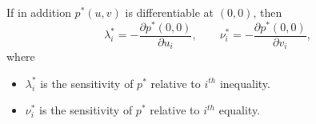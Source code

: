 \newpar{}

If in addition $p^*(u,v)$ is differentiable at $(0,0)$, then
\begin{equation*}
    \lambda_i^* = -\frac{\partial p^*(0,0)}{\partial u_i}, \qquad  \nu_i^* = -\frac{\partial p^*(0,0)}{\partial v_i},
\end{equation*}
where
\begin{itemize}
    \item $\lambda_i^*$ is the sensitivity of $p^*$ relative to $i^{th}$ inequality.
    \item $\nu_i^*$ is the sensitivity of $p^*$ relative to $i^{th}$ equality.
\end{itemize}